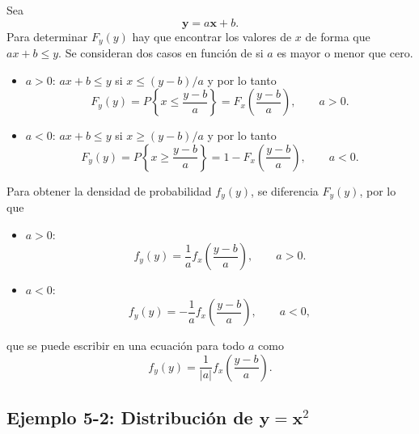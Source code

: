 \documentclass[a4paper]{report}
\newcommand{\x}{\mathbf{x}}
\newcommand{\y}{\mathbf{y}}
\begin{document}
Sea
\[
 \y=a\x+b.
\]
Para determinar \(F_y(y)\) hay que encontrar los valores de \(x\) de forma que \(ax+b\leq y\). Se consideran dos casos en función de si \(a\) es mayor o menor que cero.
\begin{itemize}
 \item \(a>0\): \(ax+b\leq y\) si \(x\leq(y-b)/a\) y por lo tanto
 \[
  F_y(y)=P\left\{x\leq\frac{y-b}{a}\right\}=F_x\left(\frac{y-b}{a}\right), \qquad a>0.
 \]
 \item \(a<0\): \(ax+b\leq y\) si \(x\geq(y-b)/a\) y por lo tanto
 \[
  F_y(y)=P\left\{x\geq\frac{y-b}{a}\right\}=1-F_x\left(\frac{y-b}{a}\right), \qquad a<0.
 \]
\end{itemize}
Para obtener la densidad de probabilidad \(f_y(y)\), se diferencia \(F_y(y)\), por lo que
\begin{itemize}
 \item \(a>0\): 
 \[
  f_y(y)=\frac{1}{a}f_x\left(\frac{y-b}{a}\right), \qquad a>0.
 \]
 \item \(a<0\): 
 \[
  f_y(y)=-\frac{1}{a}f_x\left(\frac{y-b}{a}\right), \qquad a<0,
 \]
\end{itemize}
que se puede escribir en una ecuación para todo \(a\) como
\begin{equation}\label{eq:y_equals_ax_plus_b_density}
 f_y(y)=\frac{1}{|a|}f_x\left(\frac{y-b}{a}\right).
\end{equation}

\subsection{\texorpdfstring{Ejemplo 5-2: Distribución de \(\y=\x^2\)}{}}\label{sec:x_square_distribution}
\end{document}

